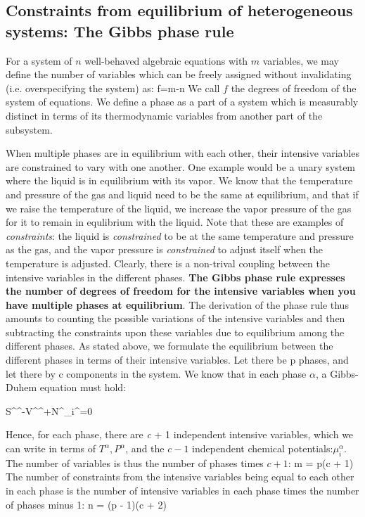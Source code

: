 \documentclass[12pt]{article}
\begin{document}
\subsection{Constraints from equilibrium of heterogeneous systems: The Gibbs phase rule} 
For a system of $n$ well-behaved algebraic equations with $m$ variables, we may define the number of variables which can be freely assigned without invalidating (i.e. overspecifying the system) as:
\eqs f=m-n \eqe
We call $f$ the degrees of freedom of the system of equations. We define a phase as a part of a system which is measurably distinct in terms of its thermodynamic variables from another part of the subsystem.

When multiple phases are in equilibrium with each other, their intensive variables are constrained to vary with one another. One example would be a unary system where the liquid is in equilibrium with its vapor. We know that the temperature and pressure of the gas and liquid need to be the same at equilibrium, and that if we raise the temperature of the liquid, we increase the vapor pressure of the gas for it to remain in equlibrium with the liquid. Note that these are examples of \emph{constraints}: the liquid is \emph{constrained} to be at the same temperature and pressure as the gas, and the vapor pressure is \emph{constrained} to adjust itself when the temperature is adjusted. Clearly, there is a non-trival coupling between the intensive variables in the different phases. \textbf{The Gibbs phase rule expresses the number of degrees of freedom for the intensive variables when you have multiple phases at equilibrium}. The derivation of the phase rule thus amounts to counting the possible variations of the intensive variables and then subtracting the constraints upon these variables due to equilibrium among the different phases.
As stated above, we formulate the equilibrium between the different phases in terms of their intensive variables. Let there be p phases, and let there by c components in the system. We know that in each phase $\alpha$, a Gibbs-Duhem equation must hold:

\eqs
S^{\alpha }^{\alpha }-V^{\alpha }^{\alpha }+N^{\alpha }_i^{\alpha }=0\eqe

Hence, for each phase, there are \textit{ c} + 1 independent intensive variables, which we can write in terms of $T^{\alpha },P^{\alpha }$, and the $c-1$ independent chemical potentials:$\mu _i^{\alpha}$. The number of variables is thus the number of phases times $c + 1$: 
\eqs m = p(c + 1) \eqe
The number of constraints from the intensive variables being equal to each other in each phase is the number of intensive variables in each phase
times the number of phases minus 1:
\eqs n = (p - 1)(c + 2) \eqe
\end{document}
